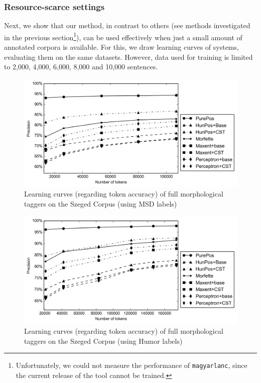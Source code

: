 \subsubsection{Resource-scarce settings}

Next, we show that our method, in contrast to others (see methods investigated in the previous section\footnote{Unfortunately, we could not measure the performance of \texttt{magyarlanc}, since the current release of the tool cannot be trained.}), can be used effectively when just a small amount of annotated corpora is available. 
For this, we draw learning curves of systems, evaluating them on the same datasets. 
However, data used for training is limited to 2,000, 4,000, 6,000, 8,000 and 10,000 sentences. 

\begin{figure}[H]
  \centering
  \includegraphics[width=1\textwidth]{MorphTagging/msd_token.png} 
  \caption{Learning curves (regarding token accuracy) of full morphological taggers on the Szeged Corpus (using MSD labels)}
  \label{fig:msd-token}
\end{figure}

\begin{figure}[H]
  \centering
  \includegraphics[width=1\textwidth]{MorphTagging/humor_token.png}
  \caption{Learning curves (regarding token accuracy) of full morphological taggers on the Szeged Corpus (using Humor labels)}
  \label{fig:humor-token}
\end{figure}

